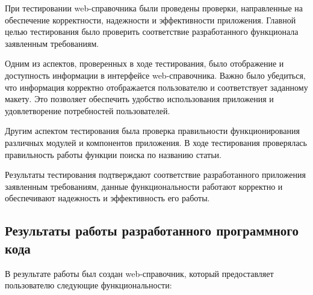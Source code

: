 При тестировании web-справочника были проведены проверки, направленные на обеспечение корректности, надежности и эффективности приложения. Главной целью тестирования было проверить соответствие разработанного функционала заявленным требованиям.

Одним из аспектов, проверенных в ходе тестирования, было отображение и доступность информации в интерфейсе web-справочника. Важно было убедиться, что информация корректно отображается пользователю и соответствует заданному макету. Это позволяет обеспечить удобство использования приложения и удовлетворение потребностей пользователей.

Другим аспектом тестирования была проверка правильности функционирования различных модулей и компонентов приложения. В ходе тестирования проверялась правильность работы функции поиска по названию статьи. 

Результаты тестирования подтверждают соответствие разработанного приложения заявленным требованиям, данные функциональности работают корректно и обеспечивают надежность и эффективность его работы.

\subsection{Результаты работы разработанного программного кода}

В результате работы был создан web-справочник, который предоставляет пользователю следующие функциональности:

